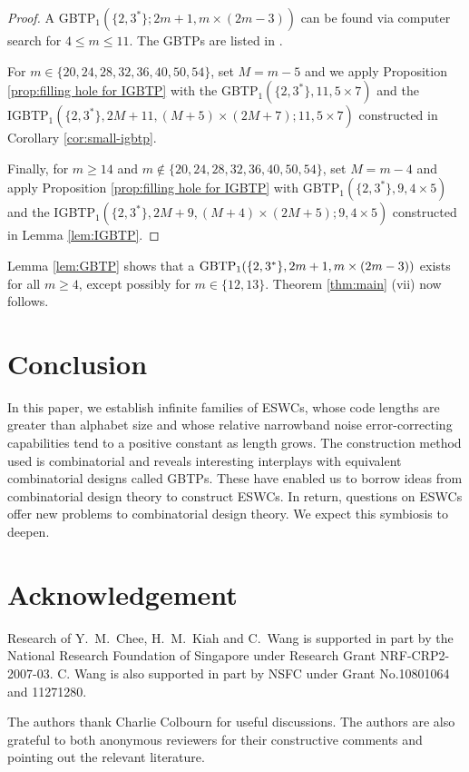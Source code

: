 \documentclass[draft, 11pt]{article}
\begin{document}
\begin{proof}
A GBTP$_1(\{2, 3^* \}; 2m + 1, m \times (2m - 3))$ can be found via computer search for $4\le m\le 11$. %
The GBTPs are listed in \cite{Cheeetal:2012online}.

For $m\in\{20,24,28,32,36,40,50,54\}$, set $M=m-5$ and we apply Proposition \ref{prop:filling hole for IGBTP}
with the GBTP$_1(\{2, 3^* \},11, 5\times 7)$ and the IGBTP$_1(\{2,3^*\},2M+11,(M+5)\times(2M+7); 11,5\times 7)$ 
constructed in Corollary \ref{cor:small-igbtp}.

Finally, for $m\ge 14$ and $m\notin\{20,24,28,32,36,40,50,54\}$, set $M=m-4$ and apply Proposition \ref{prop:filling hole for IGBTP}
with GBTP$_1(\{2, 3^* \}, 9, 4\times 5)$ and the IGBTP$_1(\{2,3^*\},2M+9,(M+4)\times(2M+5); 9,4\times 5)$ 
constructed in Lemma \ref{lem:IGBTP}.
\end{proof}

Lemma \ref{lem:GBTP}
 shows that a ${\rm GBTP}_1(\{2, 3^* \},2m + 1, m \times (2m - 3))$ exists for all $m\ge 4$, except possibly for $m\in\{12,13\}$.
 Theorem \ref{thm:main} (vii) now follows.


 \section{Conclusion}


 In this paper, we establish infinite families of ESWCs,
 whose code lengths are greater than alphabet size and
 whose relative narrowband noise error-correcting capabilities tend to a positive constant as length grows.
 The construction method used is combinatorial and reveals interesting
 interplays with equivalent combinatorial designs called
 GBTPs.
 These have enabled us to borrow ideas from combinatorial
 design theory to construct ESWCs. In return, questions on ESWCs
 offer new problems to combinatorial design theory. We expect this symbiosis
 to deepen.


\section*{Acknowledgement}


Research of Y.~M.~Chee, H.~M.~Kiah and C.~Wang is supported in part by the National Research Foundation of Singapore 
 under Research Grant NRF-CRP2-2007-03. C. Wang is also supported in part by NSFC under Grant No.10801064 and 11271280.

The authors thank Charlie Colbourn for useful discussions. 
The authors are also grateful to both anonymous reviewers for their constructive comments
and pointing out the relevant literature.
\end{document}
